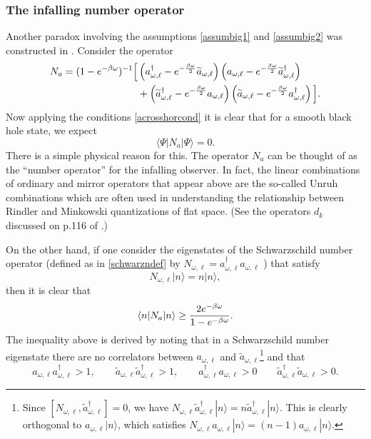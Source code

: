 \documentclass[12pt]{article}
\def\schwarzn{N}
\newcommand{\cop}[1]{#1}
\def\ta{\widetilde{\cop{a}}}
\newcommand{\be}{\begin{equation}}
\newcommand{\ee}{\end{equation}}
\begin{document}
\subsubsection{The infalling number operator}
Another paradox involving the assumptions \ref{assumbig1} and \ref{assumbig2} was constructed in \cite{Marolf:2013dba}. Consider the operator
\be
\label{nadef}
\begin{split}
N_a = (1 -e^{- \beta \omega})^{-1} \Big[ &\left(a_{\omega, \ell}^{\dagger} - e^{-{\beta \omega\over 2} }\ta_{\omega, \ell} \right) \left(a_{\omega, \ell}- e^{-{\beta \omega\over 2} } \ta_{\omega, \ell}^{\dagger} \right) \\ &+ \left( \ta_{\omega, \ell}^{\dagger} - e^{-{\beta \omega\over 2} } a_{\omega, \ell} \right) \left( \ta_{\omega, \ell}- e^{-{\beta \omega\over 2} }a_{\omega, \ell}^{\dagger} \right)  \Big].
\end{split}
\ee
Now applying the conditions \eqref{acrosshorcond} it is clear that for a smooth black hole state, we expect
\be
\label{naintypical}
\langle \Psi | N_a | \Psi \rangle = 0.
\ee
There is a simple physical reason for this. The operator $N_a$ can be thought of as the ``number operator'' for the infalling observer. In fact, the linear combinations of ordinary and mirror operators that appear above are the so-called Unruh combinations which are often used in understanding the relationship between Rindler and Minkowski quantizations of flat space. (See the operators $d_k$ discussed on p.116 of \cite{birrell1984quantum}.)

On the other hand, if one consider the eigenstates of the Schwarzschild number operator (defined as in \eqref{schwarzndef} by $\schwarzn_{\omega, \ell}=a_{\omega, \ell}^{\dagger} a_{\omega, \ell}$ ) that satisfy
\be
\schwarzn_{\omega, \ell} |n \rangle = n |n \rangle,
\ee
then it is clear that
\be
\label{nanineq}
\langle n| N_a | n \rangle \geq {2 e^{-\beta \omega} \over 1 - e^{-\beta \omega}}.
\ee
The inequality above is derived by noting that in a Schwarzschild number eigenstate there are no correlators between $a_{\omega, \ell}$ and $\ta_{\omega, \ell}$\footnote{Since $[N_{\omega, \ell}, \ta^{\dagger}_{\omega, \ell}] = 0$, we have $N_{\omega, \ell} \ta^{\dagger}_{\omega, \ell} |n \rangle = n \ta^{\dagger}_{\omega, \ell} | n \rangle$. This is clearly orthogonal to  $a_{\omega, \ell} |n \rangle$, which satisfies $N_{\omega, \ell} a_{\omega, \ell} |n \rangle = (n-1) a_{\omega, \ell} |n \rangle$.} and that
\be
a_{\omega, \ell} a_{\omega, \ell}^{\dagger} > 1, \qquad \ta_{\omega, \ell} \ta_{\omega, \ell}^{\dagger} > 1, \qquad a_{\omega, \ell}^{\dagger} a_{\omega, \ell} > 0 \qquad \ta_{\omega, \ell}^{\dagger} \ta_{\omega, \ell} > 0.
\ee
\end{document}
